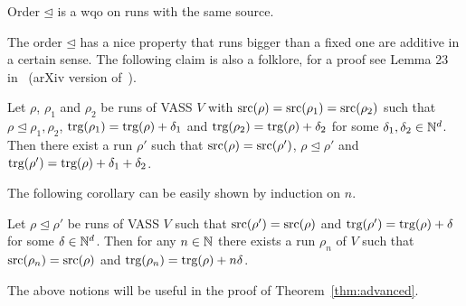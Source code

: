 \begin{claim}
Order $\unlhd$ is a wqo on runs with the same source.
\end{claim}

The order $\unlhd$ has a nice property that runs bigger than a fixed one are additive in a certain sense.
The following claim is also a folklore, for a proof see Lemma 23 in~\cite{DBLP:journals/corr/ClementeCLP16}
(arXiv version of~\cite{DBLP:conf/stacs/ClementeCLP17}).

\begin{claim}\label{cl:adding-runs}
Let $\rho$, $\rho_1$ and $\rho_2$ be runs of VASS $V$ with $\textup{src}(\rho) = \textup{src}(\rho_1) = \textup{src}(\rho_2)$
such that $\rho \unlhd \rho_1, \rho_2$,
$\textup{trg}(\rho_1) = \textup{trg}(\rho) + \delta_1$ and $\textup{trg}(\rho_2) = \textup{trg}(\rho) + \delta_2$ for some $\delta_1, \delta_2 \in \mathbb{N}^d$.
Then there exist a run $\rho'$ such that $\textup{src}(\rho) = \textup{src}(\rho')$, $\rho \unlhd \rho'$
and $\textup{trg}(\rho') = \textup{trg}(\rho) + \delta_1 + \delta_2$.
\end{claim}

The following corollary can be easily shown by induction on $n$.

\begin{corollary}\label{corr:pumping}
Let $\rho \unlhd \rho'$ be runs of VASS $V$ such that
$\textup{src}(\rho') = \textup{src}(\rho)$ and $\textup{trg}(\rho') = \textup{trg}(\rho) + \delta$ for some $\delta \in \mathbb{N}^d$.
Then for any $n \in \mathbb{N}$ there exists a run $\rho_n$ of $V$ such that $\textup{src}(\rho_n) = \textup{src}(\rho)$
and $\textup{trg}(\rho_n) = \textup{trg}(\rho) + n \delta$.
\end{corollary}

The above notions will be useful in the proof of Theorem~\ref{thm:advanced}.
